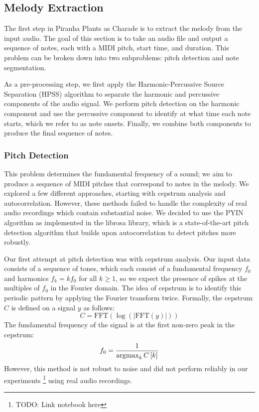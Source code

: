 \subsection{Melody Extraction}
\label{sec:melody_extraction}

The first step in Piranha Plants as Charade is to extract the melody from the input audio. The goal of this section is to take an audio file and output a sequence of notes, each with a MIDI pitch, start time, and duration. This problem can be broken down into two subproblems: pitch detection and note segmentation.

As a pre-processing step, we first apply the Harmonic-Percussive Source Separation (HPSS) algorithm \autocite{HPSS:2010,HPSS:2014} to separate the harmonic and percussive components of the audio signal. We perform pitch detection on the harmonic component and use the percussive component to identify at what time each note starts, which we refer to as note onsets. Finally, we combine both components to produce the final sequence of notes.

\subsubsection{Pitch Detection}

This problem determines the fundamental frequency of a sound; we aim to produce a sequence of MIDI pitches that correspond to notes in the melody. We explored a few different approaches, starting with cepstrum analysis and autocorrelation. However, these methods failed to handle the complexity of real audio recordings which contain substantial noise. We decided to use the PYIN algorithm as implemented in the librosa library, which is a state-of-the-art pitch detection algorithm that builds upon autocorrelation to detect pitches more robustly.


Our first attempt at pitch detection was with cepstrum analysis. Our input data consists of a sequence of tones, which each consist of a fundamental frequency $f_0$ and harmonics $f_k = k f_0$ for all $k \geq 1$, so we expect the presence of spikes at the multiples of $f_0$ in the Fourier domain. The idea of cepstrum is to identify this periodic pattern by applying the Fourier transform twice. Formally, the cepstrum $C$ is defined on a signal $y$ as follows:
$$C = \text{FFT}\left(\log\left(\left|\text{FFT}\left(y\right)\right|\right)\right)$$
The fundamental frequency of the signal is at the first non-zero peak in the cepstrum:
$$f_0 = \frac{1}{\operatorname*{\arg\!\max}_{k} C\left[k\right]}$$
However, this method is not robust to noise and did not perform reliably in our experiments \footnote{TODO: Link notebook here} using real audio recordings.

